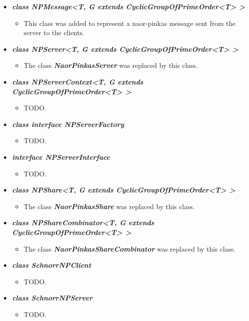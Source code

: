 \documentclass[a4paper,10pt]{scrartcl}
\begin{document}
\begin{itemize}
	\item \textit{\textbf{class NPMessage<T, G extends CyclicGroupOfPrimeOrder<T> >}}
	\begin{itemize}
	 \item This class was added to represent a naor-pinkas message sent from the server to the clients.
	\end{itemize}
	
	\item \textit{\textbf{class NPServer<T, G extends CyclicGroupOfPrimeOrder<T> >}}
	\begin{itemize}
	 \item The class \textit{\textbf{NaorPinkasServer}} was replaced by this class.
	\end{itemize}
	
	\item \textit{\textbf{class NPServerContext<T, G extends CyclicGroupOfPrimeOrder<T> >}}
	\begin{itemize}
	 \item TODO.
	\end{itemize}
	
	\item \textit{\textbf{class interface NPServerFactory}}
	\begin{itemize}
	 \item TODO.
	\end{itemize}
	
	\item \textit{\textbf{interface NPServerInterface}}
	\begin{itemize}
	 \item TODO.
	\end{itemize}
	
	\item \textit{\textbf{class NPShare<T, G extends CyclicGroupOfPrimeOrder<T> >}}
	\begin{itemize}
	 \item The class \textit{\textbf{NaorPinkasShare}} was replaced by this class.
	\end{itemize}
	
	\item \textit{\textbf{class NPShareCombinator<T, G extends CyclicGroupOfPrimeOrder<T> >}}
	\begin{itemize}
	 \item The class \textit{\textbf{NaorPinkasShareCombinator}} was replaced by this class.
	\end{itemize}
	
	\item \textit{\textbf{class SchnorrNPClient}}
	\begin{itemize}
	 \item TODO.
	\end{itemize}
	
	\item \textit{\textbf{class SchnorrNPServer}}
	\begin{itemize}
	 \item TODO.
	\end{itemize}
		
\end{itemize}
	
\end{document}
